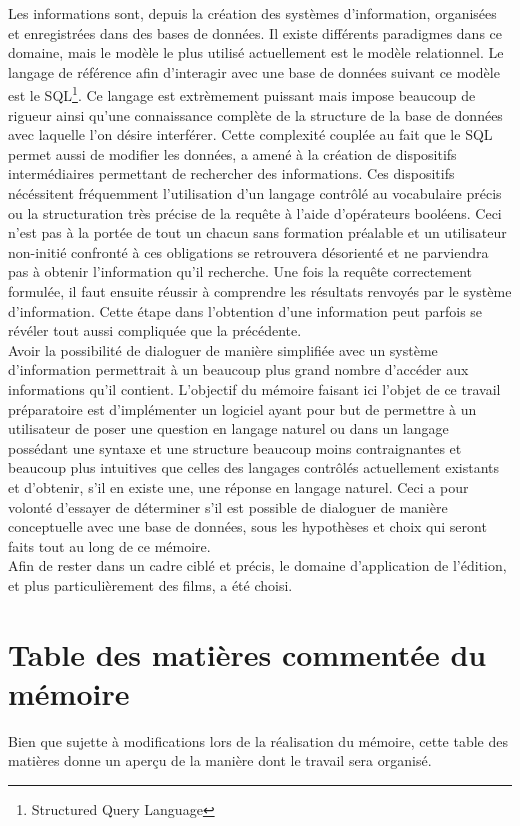 \documentclass[a4paper,12pt]{article}
\begin{document}
Les informations sont, depuis la création des systèmes d'information, organisées et enregistrées dans des bases de données.
Il existe différents paradigmes dans ce domaine, mais le modèle le plus utilisé actuellement est le modèle relationnel.
Le langage de référence afin d'interagir avec une base de données suivant ce modèle est le SQL\footnote{Structured Query Language}.
Ce langage est extrèmement puissant mais impose beaucoup de rigueur ainsi qu'une connaissance complète de la structure de la base de données avec laquelle l'on désire interférer.
Cette complexité couplée au fait que le SQL permet aussi de modifier les données, a amené à la création de dispositifs intermédiaires permettant de rechercher des informations.
Ces dispositifs nécéssitent fréquemment l'utilisation d'un langage contrôlé au vocabulaire précis ou la structuration très précise de la requête à l'aide d'opérateurs booléens. 
Ceci n'est pas à la portée de tout un chacun sans formation préalable et un utilisateur non-initié confronté à ces obligations se retrouvera désorienté et ne parviendra pas à obtenir l'information qu'il recherche. 
Une fois la requête correctement formulée, il faut ensuite réussir à comprendre les résultats renvoyés par le système d'information.
Cette étape dans l'obtention d'une information peut parfois se révéler tout aussi compliquée que la précédente. \\

Avoir la possibilité de dialoguer de manière simplifiée avec un système d'information permettrait à un beaucoup plus grand nombre d'accéder aux informations qu'il contient.
L'objectif du mémoire faisant ici l'objet de ce travail préparatoire est d'implémenter un logiciel ayant pour but de permettre à un utilisateur de poser une question en langage naturel ou dans un langage possédant une syntaxe et une structure beaucoup moins contraignantes et beaucoup plus intuitives que celles des langages contrôlés actuellement existants et d'obtenir, s'il en existe une, une réponse en langage naturel.
Ceci a pour volonté d'essayer de déterminer s'il est possible de dialoguer de manière conceptuelle avec une base de données, sous les hypothèses et choix qui seront faits tout au long de ce mémoire. \\

Afin de rester dans un cadre ciblé et précis, le domaine d'application de l'édition, et plus particulièrement des films, a été choisi.

\newpage
\section{Table des matières commentée du mémoire}
Bien que sujette à modifications lors de la réalisation du mémoire, cette table des matières donne un aperçu de la manière dont le travail sera organisé.
\end{document}
